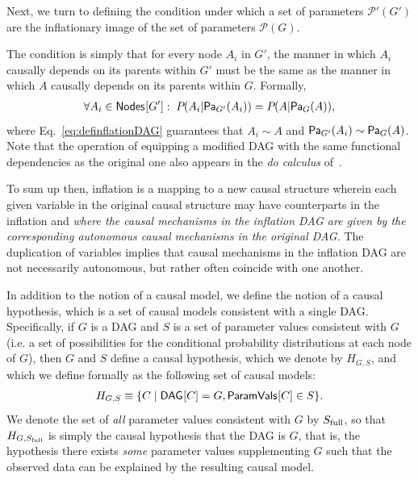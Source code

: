 Next, we turn to defining the condition under which a set of parameters $\mathcal{P'}(G')$ are the inflationary image of the set of parameters $\mathcal{P}(G)$. 

The condition is simply that for every node $A_i$ in $G'$, the manner in which $A_i$ causally depends on its parents within $G'$ must be the same as the manner in which $A$ causally depends on its parents within $G$.   Formally, 
\begin{align}\label{eq:funcdependences}
\forall A_i \in \SmallNamedFunction{Nodes}{G'}:\; \pdf{A_i| \Pa[G']{A_i}}=\pdf{A|\Pa[G]{A}},
\end{align}
where Eq.~\eqref{eq:definflationDAG} guarantees that $A_i \sim A$ and $\Pa[G']{A_i} \sim \Pa[G]{A}$.  Note that the operation of equipping a modified DAG with the same functional dependencies as the original one also appears in the \emph{do calculus} of~\citet{pearl2009causality}. 

To sum up then, inflation is a mapping to a new causal structure wherein each given variable in the original causal structure may have counterparts in the inflation and {\em where the causal mechanisms in the inflation DAG are given by the corresponding autonomous causal mechanisms in the original DAG.}  The duplication of variables implies that causal mechanisms in the inflation DAG are not necessarily autonomous, but rather often coincide with one another.

In addition to the notion of a causal model, we define the notion of a causal hypothesis, which is a set of causal models consistent with a single DAG. Specifically, if $G$ is a DAG and $S$ is a set of parameter values  consistent with $G$ (i.e. a set of possibilities for the conditional probability distributions at each node of $G$), then $G$ and $S$ define a causal hypothesis, which we denote by $H_{G,S}$, and which we define formally as the following set of causal models:
\begin{align}
H_{G,S} \equiv \{ C \mid \SmallNamedFunction{DAG}{C}=G, \SmallNamedFunction{ParamVals}{C} \in S\}.
\end{align}
We denote  the set of {\em all} parameter values consistent with $G$ by $S_{\rm full}$, so that $H_{G,{S_{\rm full}}}$ is simply the causal hypothesis that the DAG is $G$, that is, the hypothesis there exists {\em some} parameter values supplementing $G$ such that the observed data can be explained by the resulting causal model. 

